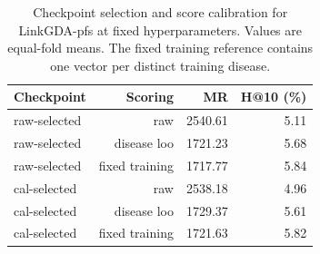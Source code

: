 \begin{table}[tb]
\centering\small
\caption{Checkpoint selection and score calibration for LinkGDA-pfs at fixed hyperparameters. Values are equal-fold means. The fixed training reference contains one vector per distinct training disease.}
\label{tab:calibration}
\begin{tabular}{lrrr}
\toprule
Checkpoint & Scoring & MR & H@10 (\%) \\
\midrule
raw-selected & raw & 2540.61 & 5.11 \\
raw-selected & disease loo & 1721.23 & 5.68 \\
raw-selected & fixed training & 1717.77 & 5.84 \\
cal-selected & raw & 2538.18 & 4.96 \\
cal-selected & disease loo & 1729.37 & 5.61 \\
cal-selected & fixed training & 1721.63 & 5.82 \\
\bottomrule
\end{tabular}
\end{table}
